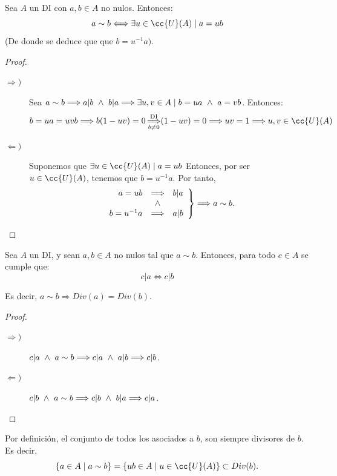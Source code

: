 \begin{prop}
    Sea $A$ un DI con $a,b \in A$ no nulos. Entonces:
    $$a\sim b \Longleftrightarrow \exists u \in \cc{U}(A) \mid a=ub$$
    (De donde se deduce que que $b = u^{-1}a)$.
\end{prop}
\begin{proof} \
\begin{description}
    \item [$\Longrightarrow)$] Sea $a\sim b \Longrightarrow a|b \ \land \  b|a \Longrightarrow \exists u,v \in A \mid b=ua \ \land \  a=vb$. Entonces:
    $$b=ua=uvb \Longrightarrow b(1-uv)=0 \mathop{\Longrightarrow}^{\text{DI}}_{b\neq0} (1-uv)=0 \Longrightarrow uv = 1
        \Longrightarrow u,v \in \cc{U}(A)$$
        
    \item [$\Longleftarrow)$] Suponemos que $\exists u \in \cc{U}(A) \mid a=ub$ Entonces, por ser $u\in \cc{U}(A)$, tenemos que $b=u^{-1}a$. Por tanto,
        $$\left. \begin{array}{rcl}
            a=ub &\Longrightarrow& b|a \\ &\ \land \  & \\
            b=u^{-1}a &\Longrightarrow& a|b
        \end{array} \right\} \Longrightarrow a\sim b.$$
\end{description} 
\end{proof}

\begin{lema}
    Sea $A$ un DI, y sean $a,b\in A$ no nulos tal que $a\sim b$. Entonces, para todo $c\in A$ se cumple que:
    $$c|a \Longleftrightarrow c|b$$
    
    Es decir, $a\sim b \Longrightarrow Div(a)=Div(b)$.
\end{lema}
\begin{proof}\
    \begin{description}
        \item[$\Longrightarrow)$] $c|a \ \land \  a\sim b \Longrightarrow c|a \ \land \  a|b \Longrightarrow c|b$.
        \item[$\Longleftarrow)$] $c|b \ \land \  a\sim b \Longrightarrow c|b \ \land \  b|a \Longrightarrow c|a$.
    \end{description}
\end{proof}

Por definición, el conjunto de todos los asociados a $b$, son siempre divisores de $b$. Es decir,
$$\{a\in A \mid a\sim b\} = \{ub \in A \mid u\in \cc{U}(A)\}\subset Div(b).$$


